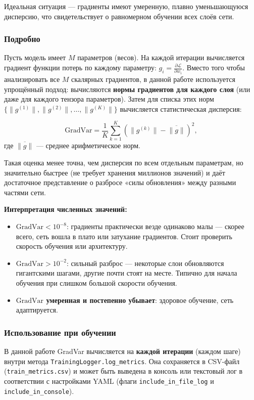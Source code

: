 \documentclass[12pt,a4paper]{article}
\begin{document}
Идеальная ситуация — градиенты имеют умеренную, плавно уменьшающуюся дисперсию, что свидетельствует о равномерном обучении всех слоёв сети.

\subsubsection{Подробно}

Пусть модель имеет \(M\) параметров (весов). На каждой итерации вычисляется градиент функции потерь по каждому параметру: \(g_i = \frac{\partial \mathcal{L}}{\partial w_i}\). Вместо того чтобы анализировать все \(M\) скалярных градиентов, в данной работе используется упрощённый подход: вычисляются \textbf{нормы градиентов для каждого слоя} (или даже для каждого тензора параметров). Затем для списка этих норм \( \{ \|g^{(1)}\|, \|g^{(2)}\|, \dots, \|g^{(K)}\| \} \) вычисляется статистическая дисперсия:

\[
\text{GradVar} = \frac{1}{K}\sum_{k=1}^{K} \left( \|g^{(k)}\| - \overline{\|g\|} \right)^2,
\]
где \(\overline{\|g\|}\) — среднее арифметическое норм.

Такая оценка менее точна, чем дисперсия по всем отдельным параметрам, но значительно быстрее (не требует хранения миллионов значений) и даёт достаточное представление о разбросе «силы обновления» между разными частями сети.

\textbf{Интерпретация численных значений:}
\begin{itemize}
    \item \textbf{\(\text{GradVar} < 10^{-8}\)}: градиенты практически везде одинаково малы — скорее всего, сеть вошла в плато или затухание градиентов. Стоит проверить скорость обучения или архитектуру.
    \item \textbf{\(\text{GradVar} > 10^{-2}\)}: сильный разброс — некоторые слои обновляются гигантскими шагами, другие почти стоят на месте. Типично для начала обучения при слишком большой скорости обучения.
    \item \textbf{\(\text{GradVar}\) умеренная и постепенно убывает}: здоровое обучение, сеть адаптируется.
\end{itemize}

\subsubsection{Использование при обучении}

В данной работе GradVar вычисляется на \textbf{каждой итерации} (каждом шаге) внутри метода \texttt{TrainingLogger.log\_metrics}. Она сохраняется в CSV-файл (\texttt{train\_metrics.csv}) и может быть выведена в консоль или текстовый лог в соответствии с настройками YAML (флаги \texttt{include\_in\_file\_log} и \texttt{include\_in\_console}).
\end{document}
